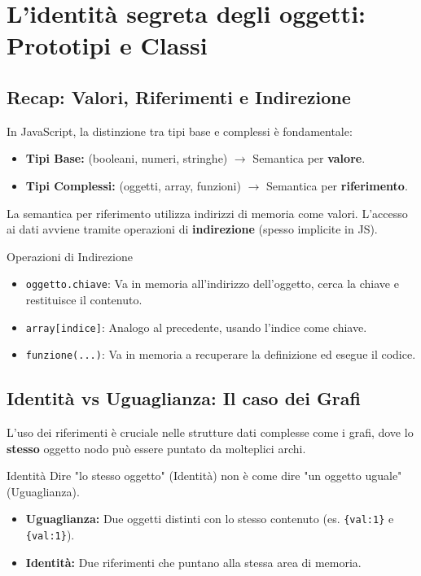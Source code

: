 \section{L'identità segreta degli oggetti: Prototipi e Classi}

\subsection{Recap: Valori, Riferimenti e Indirezione}
In JavaScript, la distinzione tra tipi base e complessi è fondamentale:
\begin{itemize}
    \item \textbf{Tipi Base:} (booleani, numeri, stringhe) $\rightarrow$ Semantica per \textbf{valore}.
    \item \textbf{Tipi Complessi:} (oggetti, array, funzioni) $\rightarrow$ Semantica per \textbf{riferimento}.
\end{itemize}

La semantica per riferimento utilizza indirizzi di memoria come valori. L'accesso ai dati avviene tramite operazioni di \textbf{indirezione} (spesso implicite in JS).

\begin{definition}{Operazioni di Indirezione}
    \begin{itemize}
        \item \texttt{oggetto.chiave}: Va in memoria all'indirizzo dell'oggetto, cerca la chiave e restituisce il contenuto.
        \item \texttt{array[indice]}: Analogo al precedente, usando l'indice come chiave.
        \item \texttt{funzione(...)}: Va in memoria a recuperare la definizione ed esegue il codice.
    \end{itemize}
\end{definition}

\subsection{Identità vs Uguaglianza: Il caso dei Grafi}
L'uso dei riferimenti è cruciale nelle strutture dati complesse come i grafi, dove lo \textbf{stesso} oggetto nodo può essere puntato da molteplici archi.

\begin{concept}{Identità}
Dire "lo stesso oggetto" (Identità) non è come dire "un oggetto uguale" (Uguaglianza).
\begin{itemize}
    \item \textbf{Uguaglianza:} Due oggetti distinti con lo stesso contenuto (es. \texttt{\{val:1\}} e \texttt{\{val:1\}}).
    \item \textbf{Identità:} Due riferimenti che puntano alla stessa area di memoria.
\end{itemize}
\end{concept}

